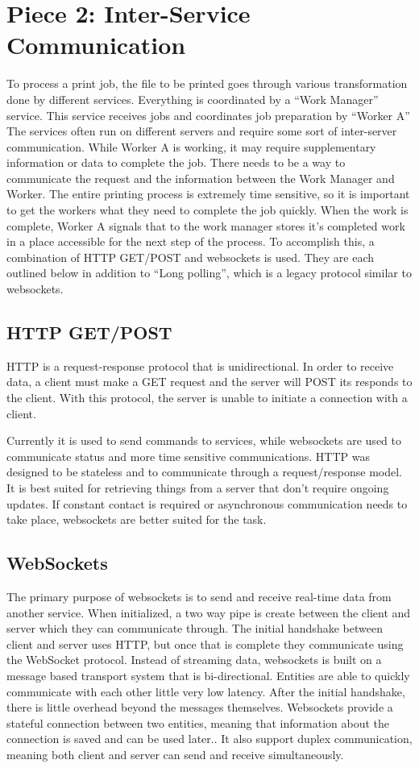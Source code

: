 \documentclass[onecolumn, draftclsnofoot,10pt, compsoc]{IEEEtran}
\begin{document}
\section{Piece 2: Inter-Service Communication}
To process a print job, the file to be printed goes through various transformation done by different services.
Everything is coordinated by a “Work Manager” service.
This service receives jobs and coordinates job preparation by “Worker A”
The services often run on different servers and require some sort of inter-server communication.
While Worker A is working, it may require supplementary information or data to complete the job.
There needs to be a way to communicate the request and the information between the Work Manager and Worker.
The entire printing process is extremely time sensitive, so it is important to get the workers what they need to complete the job quickly.
When the work is complete, Worker A signals that to the work manager stores it’s completed work in a place accessible for the next step of the process.
To accomplish this, a combination of HTTP GET/POST and websockets is used.
They are each outlined below in addition to “Long polling”, which is a legacy protocol similar to websockets.

\subsection{HTTP GET/POST}
HTTP is a request-response protocol that is unidirectional.
In order to receive data, a client must make a GET request and the server will POST its responds to the client.
With this protocol, the server is unable to initiate a connection with a client.

Currently it is used to send commands to services, while websockets are used to communicate status and more time sensitive communications.
HTTP was designed to be stateless and to communicate through a request/response model.
It is best suited for retrieving things from a server that don’t require ongoing updates.
If constant contact is required or asynchronous communication needs to take place, websockets are better suited for the task.

\subsection{WebSockets}
The primary purpose of websockets is to send and receive real-time data from another service.
When initialized, a two way pipe is create between the client and server which they can communicate through.
The initial handshake between client and server uses HTTP, but once that is complete they communicate using the WebSocket protocol.
Instead of streaming data, websockets is built on a message based transport system that is bi-directional.
Entities are able to quickly communicate with each other little very low latency.
After the initial handshake, there is little overhead beyond the messages themselves.
Websockets provide a stateful connection between two entities, meaning that information about the connection is saved and can be used later..
It also support duplex communication, meaning both client and server can send and receive simultaneously.
\end{document}
